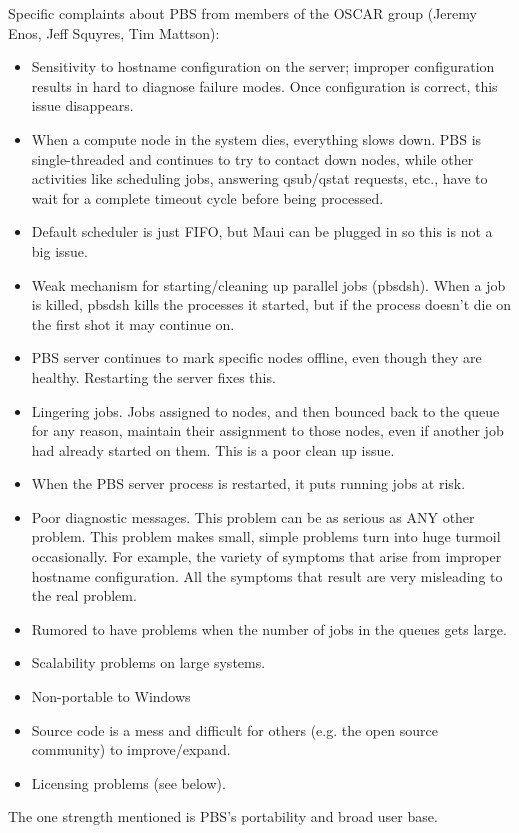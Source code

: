 \documentclass{article}
\begin{document}
Specific complaints about PBS from members of the OSCAR group (Jeremy Enos, 
Jeff Squyres, Tim Mattson):
\begin{itemize}
\item Sensitivity to hostname configuration on the server; improper 
      configuration results in hard to diagnose failure modes.  Once 
      configuration is correct, this issue disappears.
\item When a compute node in the system dies, everything slows down.  
      PBS is single-threaded and continues to try to contact down nodes,
      while other activities like scheduling jobs, answering qsub/qstat 
      requests, etc., have to wait for a complete timeout cycle before being
      processed.
\item Default scheduler is just FIFO, but Maui can be plugged in so this
      is not a big issue.
\item Weak mechanism for starting/cleaning up parallel jobs (pbsdsh).
      When a job is killed, pbsdsh kills the processes it started, but
      if the process doesn't die on the first shot it may continue on.
\item PBS server continues to mark specific nodes offline, even though they 
      are healthy.  Restarting the server fixes this.
\item Lingering jobs.  Jobs assigned to nodes, and then bounced back to the 
      queue for any reason, maintain their assignment to those nodes, even 
      if another job had already started on them.  This is a poor clean up 
      issue.
\item When the PBS server process is restarted, it puts running jobs at risk.
\item Poor diagnostic messages.  This problem can be as serious as ANY other 
      problem.  This problem makes small, simple problems turn into huge 
      turmoil occasionally.  For example, the variety of symptoms that arise 
      from improper hostname configuration.  All the symptoms that result are 
      very misleading to the real problem.
\item Rumored to have problems when the number of jobs in the queues gets
      large.
\item Scalability problems on large systems.
\item Non-portable to Windows
\item Source code is a mess and difficult for others (e.g. the open source
      community) to improve/expand.
\item Licensing problems (see below).
\end{itemize}
The one strength mentioned is PBS's portability and broad user base.
\end{document}
